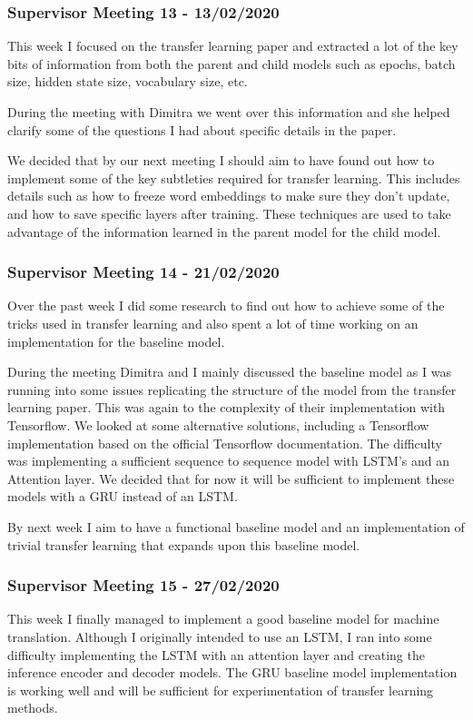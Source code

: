 \subsubsection{Supervisor Meeting 13 - 13/02/2020}
This week I focused on the transfer learning paper and extracted a lot of the key bits of information from both the parent and child models such as epochs, batch size, hidden state size, vocabulary size, etc. 

During the meeting with Dimitra we went over this information and she helped clarify some of the questions I had about specific details in the paper.

We decided that by our next meeting I should aim to have found out how to implement some of the key subtleties required for transfer learning. This includes details such as how to freeze word embeddings to make sure they don't update, and how to save specific layers after training. These techniques are used to take advantage of the information learned in the parent model for the child model.

\subsubsection{Supervisor Meeting 14 - 21/02/2020}
Over the past week I did some research to find out how to achieve some of the tricks used in transfer learning and also spent a lot of time working on an implementation for the baseline model.

During the meeting Dimitra and I mainly discussed the baseline model as I was running into some issues replicating the structure of the model from the transfer learning paper. This was again to the complexity of their implementation with Tensorflow. We looked at some alternative solutions, including a Tensorflow implementation based on the official Tensorflow documentation. The difficulty was implementing a sufficient sequence to sequence model with LSTM's and an Attention layer. We decided that for now it will be sufficient to implement these models with a \acrshort{GRU} instead of an LSTM.

By next week I aim to have a functional baseline model and an implementation of trivial transfer learning that expands upon this baseline model.

\subsubsection{Supervisor Meeting 15 - 27/02/2020}
This week I finally managed to implement a good baseline model for machine translation. Although I originally intended to use an \acrshort{LSTM}, I ran into some difficulty implementing the LSTM with an attention layer and creating the inference encoder and decoder models. The \acrshort{GRU} baseline model implementation is working well and will be sufficient for experimentation of transfer learning methods.

